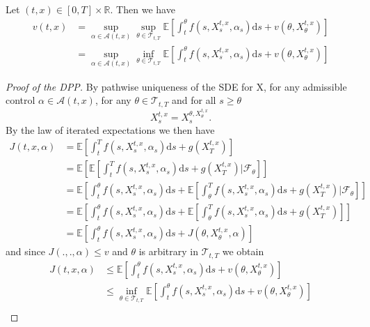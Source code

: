 \begin{theorem}
    Let $(t,x)\in[0,T]\times\mathbb{R}.$ Then we have
    \begin{align}
        v(t,x)&=\sup_{\alpha\in\mathcal{A}(t,x)}\sup_{\theta\in\mathcal{T}_{t,T}}\mathbb{E}\left[\int_{t}^\theta f(s,X_s^{t,x},\alpha_s)\mathrm ds+v(\theta,X_\theta^{t,x})\right]\\
        &=\sup_{\alpha\in\mathcal{A}(t,x)}\inf_{\theta\in\mathcal{T}_{t,T}}\mathbb{E}\left[\int_{t}^\theta f(s,X_s^{t,x},\alpha_s)\mathrm ds+v(\theta,X_\theta^{t,x})\right]
    \end{align}
\end{theorem}
\begin{proof}[Proof of the DPP]
    By pathwise uniqueness of the SDE for X, for any admissible control $\alpha\in\mathcal{A}(t,x)$,
    for any $\theta\in\mathcal{T}_{t,T}$ and for all $s\geq\theta$
    \begin{equation*}
        X_s^{t,x}=X_s^{\theta,X_\theta^{t,x}}.
    \end{equation*}
    By the law of iterated expectations we then have
    \begin{align*}
        J(t,x,\alpha)&=\mathbb{E}\left[\int_t^Tf(s,X_s^{t,x},\alpha_s)\mathrm ds+g(X_T^{t,x})\right]\\
        &=\mathbb{E}\left[\mathbb{E}\left[\int_t^Tf(s,X_s^{t,x},\alpha_s)\mathrm ds+g(X_T^{t,x})|\mathcal{F}_\theta\right]\right]\\
        &=\mathbb{E}\left[\int_t^\theta f(s,X_s^{t,x},\alpha_s)\mathrm ds+\mathbb{E}\left[\int_\theta^Tf(s,X_s^{t,x},\alpha_s)\mathrm ds+g(X_T^{t,x})|\mathcal{F}_\theta\right]\right]\\
        &=\mathbb{E}\left[\int_t^\theta f(s,X_s^{t,x},\alpha_s)\mathrm ds+\mathbb{E}\left[\int_\theta^Tf(s,X_s^{t,x},\alpha_s)\mathrm ds+g(X_T^{t,x})\right]\right]\\
        &=\mathbb{E}\left[\int_t^\theta f(s,X_s^{t,x},\alpha_s)\mathrm ds+J(\theta,X_\theta^{t,x},\alpha)\right]
    \end{align*}
    and since $J(.,.,\alpha)\leq v$ and $\theta$ is arbitrary in $\mathcal{T}_{t,T}$
    we obtain
    \begin{align*}
        J(t,x,\alpha)&\leq\mathbb{E}\left[\int_t^\theta f(s,X_s^{t,x},\alpha_s)\mathrm ds+v(\theta,X_\theta^{t,x})\right]\\
        &\leq\inf_{\theta\in\mathcal{T}_{t,T}}\mathbb{E}\left[\int_t^\theta f(s,X_s^{t,x},\alpha_s)\mathrm ds+v(\theta,X_\theta^{t,x})\right]\\

\end{align*}
\end{proof}
